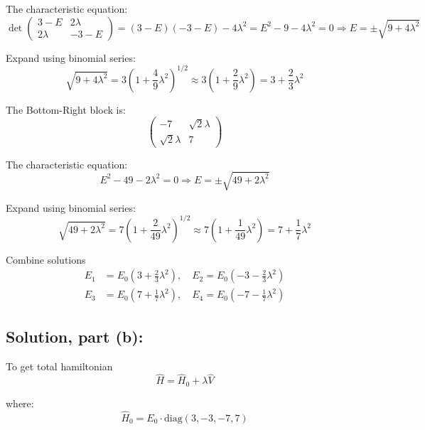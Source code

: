 \documentclass[12pt]{article}
\begin{document}
        The characteristic equation:
        \[
            \det 
            \begin{pmatrix}
                3 - E & 2\lambda \\
                2\lambda & -3 - E
            \end{pmatrix} = (3 - E)(-3 - E) - 4\lambda^2 = E^2 - 9 - 4\lambda^2 = 0
            \Rightarrow E = \pm \sqrt{9 + 4\lambda^2}
        \]

        Expand using binomial series:
        \[
            \sqrt{9 + 4\lambda^2} = 3\left(1 + \frac{4}{9} \lambda^2\right)^{1/2} \approx 3\left(1 + \frac{2}{9} \lambda^2\right)
            = 3 + \frac{2}{3} \lambda^2
        \]

        The Bottom-Right block is:
        \[
            \begin{pmatrix}
                -7 & \sqrt{2}\lambda \\
                \sqrt{2}\lambda & 7
            \end{pmatrix}
        \]

        The characteristic equation:
        \[
            E^2 - 49 - 2\lambda^2 = 0 \Rightarrow E = \pm \sqrt{49 + 2\lambda^2}
        \]

        Expand using binomial series:
        \[
            \sqrt{49 + 2\lambda^2} = 7\left(1 + \frac{2}{49} \lambda^2\right)^{1/2} \approx 7\left(1 + \frac{1}{49} \lambda^2\right)
            = 7 + \frac{1}{7} \lambda^2
        \]

        Combine solutions
        \[
            \boxed{
            \begin{aligned}
                E_1 &= E_0\left(3 + \frac{2}{3} \lambda^2\right), \quad
                E_2 = E_0\left(-3 - \frac{2}{3} \lambda^2\right) \\
                E_3 &= E_0\left(7 + \frac{1}{7} \lambda^2\right), \quad
                E_4 = E_0\left(-7 - \frac{1}{7} \lambda^2\right)
            \end{aligned}}
        \]

    \subsection{Solution, part (b):}
        To get total hamiltonian 
        \[
            \hat{H} = \hat{H}_0 + \lambda \hat{V} 
        \] 
                    
        where:
        \[
            \hat{H}_0 = E_0 \cdot \text{diag}(3, -3, -7, 7)
        \]
\end{document}
